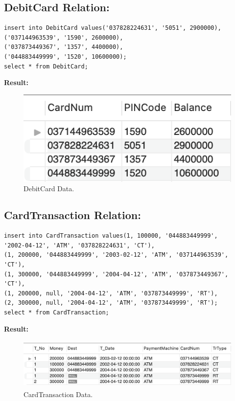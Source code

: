 \documentclass[12pt,a4paper]{article}
\begin{document}
\subsection{DebitCard Relation:}
\begin{verbatim}
insert into DebitCard values('037828224631', '5051', 2900000), 
('037144963539', '1590', 2600000), 
('037873449367', '1357', 4400000),
('044883449999', '1520', 10600000);     
select * from DebitCard;
\end{verbatim}

\textbf{Result:}
\begin{figure}[H]
    \centering
    \includegraphics[]{Picture/DebitCardData.png}
    \caption{DebitCard Data.}
\end{figure}

\subsection{CardTransaction Relation:}
\begin{verbatim}
insert into CardTransaction values(1, 100000, '044883449999', 
'2002-04-12', 'ATM', '037828224631', 'CT'), 
(1, 200000, '044883449999', '2003-02-12', 'ATM', '037144963539', 'CT'),
(1, 300000, '044883449999', '2004-04-12', 'ATM', '037873449367', 'CT'),
(1, 200000, null, '2004-04-12', 'ATM', '037873449999', 'RT'),
(2, 300000, null, '2004-04-12', 'ATM', '037873449999', 'RT');
select * from CardTransaction;
\end{verbatim}

\textbf{Result:}
\begin{figure}[H]
    \centering
    \includegraphics[width=5.5in,height=1in]{Picture/CardTransactionData.png}
    \caption{CardTransaction Data.}
\end{figure}
\end{document}
